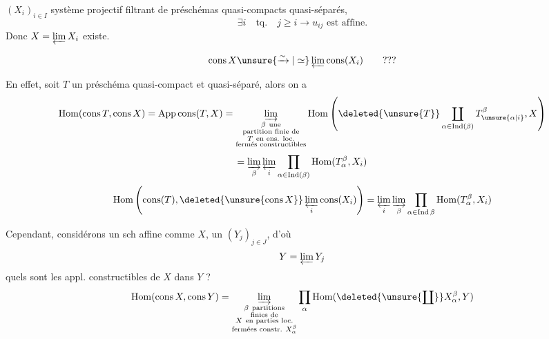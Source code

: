 $(X_i)_{i\in I}$ système projectif filtrant de préschémas quasi-compacts quasi-séparés,
\[
\exists i\quad\text{tq.}\quad j\geq i\longrightarrow u_{ij}\text{ est affine}.
\]
Donc $X=\varprojlim X_i$ existe.

 
\[
\operatorname{cons}X\unsure{\xrightarrow{\sim}|\simeq}\varprojlim\operatorname{cons}(X_i)\qquad ???
\]

En effet, soit $T$ un préschéma quasi-compact et quasi-séparé, alors on a
\[
\operatorname{Hom}(\operatorname{cons}T,\operatorname{cons}X)
=\operatorname{App\,cons}(T,X)
=\varinjlim_{\substack{\beta\ \text{une}\\\text{partition finie de}\\T\ \text{en ens. loc.}\\\text{fermés constructibles}}}
\operatorname{Hom}\left(\deleted{\unsure{T}}\coprod_{\alpha\in\operatorname{Ind}(\beta)}T_{\unsure{\alpha|i}}^\beta,X\right)
\]
\[
=\varinjlim_\beta\varprojlim_i\prod_{\alpha\in\operatorname{Ind}(\beta)}\operatorname{Hom}(T_\alpha^\beta,X_i)
\]
\[
\operatorname{Hom}\left(\operatorname{cons}(T),\deleted{\unsure{\operatorname{cons}X}}\varprojlim_i\operatorname{cons}(X_i)\right)
=\varprojlim_i\varinjlim_\beta\prod_{\alpha\in\operatorname{Ind}\beta}\operatorname{Hom}(T_\alpha^\beta,X_i)
\]

Cependant, considérons un sch affine comme $X$, un $(Y_j)_{j\in J}$, d'où
\[
Y=\varprojlim Y_j
\]
quels sont les  appl. constructibles de $X$ dans $Y$ ? 
\[
\operatorname{Hom}(\operatorname{cons}X,\operatorname{cons}Y)
=\varinjlim_{\substack{\beta\ \text{partitions}\\\text{finies de}\\X\ \text{en parties loc.}\\\text{fermées constr.}\ X_\alpha^\beta}}
\prod_\alpha\operatorname{Hom}(\deleted{\unsure{\coprod}}X_\alpha^\beta,Y)
\]
